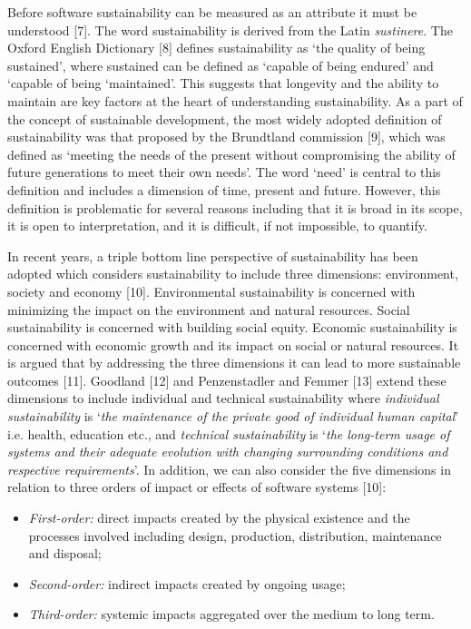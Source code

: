 \documentclass[preprint,12pt,authoryear]{elsarticle}
\begin{document}
Before software sustainability can be measured as an attribute it must
be understood [7]. The word sustainability is derived from the Latin
{\emph{sustinere}}. The Oxford English Dictionary [8] defines
sustainability as ‘the quality of being sustained’, where
sustained can be defined as ‘capable of being endured’ and ‘capable of
being ‘maintained’. This suggests that longevity and the ability to
maintain are key factors at the heart of understanding sustainability.
As a part of the concept of sustainable development, the most widely
adopted definition of sustainability was that proposed by the
Brundtland commission [9], which was defined as ‘meeting the needs of
the present without compromising the ability of future generations to
meet their own needs’. The word ‘need’ is central to this definition
and includes a dimension of time, present and future. However, this
definition is problematic for several reasons including that it is
broad in its scope, it is open to interpretation, and it is difficult,
if not impossible, to quantify.

In recent years, a triple bottom line perspective of sustainability
has been adopted which considers sustainability to include three
dimensions: environment, society and economy [10]. Environmental
sustainability is concerned with minimizing the impact on the
environment and natural resources. Social sustainability is concerned
with building social equity. Economic sustainability is concerned with
economic growth and its impact on social or natural resources. It is
argued that by addressing the three dimensions it can lead to more
sustainable outcomes [11]. Goodland [12] and Penzenstadler and Femmer
[13] extend these dimensions to include individual and technical
sustainability where {\emph{individual sustainability}} is `{\emph{the
maintenance of the private good of individual human capital}}'
i.e. health, education etc., and {\emph{technical sustainability}} is
`{\emph{the long-term usage of systems and their adequate evolution
with changing surrounding conditions and respective
requirements}}'. In addition, we can also consider the five dimensions
in relation to three orders of impact or effects of software systems
[10]:

\begin{itemize}
\item {\emph{First-order:}} direct impacts created by the physical
existence and the processes involved including design, production,
distribution, maintenance and disposal;
\item {\emph{Second-order:}} indirect impacts created by ongoing
usage;
\item {\emph{Third-order:}} systemic impacts aggregated over the
medium to long term.
\end{itemize}
\end{document}
